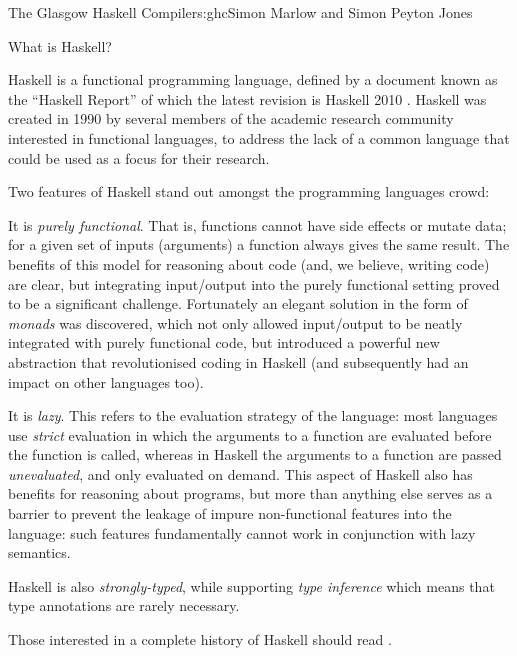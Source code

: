 \begin{aosachapter}{The Glasgow Haskell Compiler}{s:ghc}{Simon Marlow and Simon Peyton Jones}
\begin{aosasect1}{What is Haskell?}

Haskell is a functional programming language, defined by a document
known as the ``Haskell Report'' of which the latest revision is
Haskell 2010 \cite{bib:haskell2010}.  Haskell was created in 1990 by
several members of the academic research community interested in
functional languages, to address the lack of a common language that
could be used as a focus for their research.

Two features of Haskell stand out amongst the programming languages
crowd:

\begin{aosaitemize}

\item It is \emph{purely functional}.  That is, functions cannot have
  side effects or mutate data; for a given set of inputs (arguments) a
  function always gives the same result.  The benefits of this model
  for reasoning about code (and, we believe, writing code) are clear,
  but integrating input/output into the purely functional setting
  proved to be a significant challenge.  Fortunately an elegant
  solution in the form of \emph{monads} was discovered, which not only
  allowed input/output to be neatly integrated with purely functional
  code, but introduced a powerful new abstraction that revolutionised
  coding in Haskell (and subsequently had an impact on other languages
  too).

\item It is \emph{lazy}.  This refers to the evaluation strategy of
  the language: most languages use \emph{strict} evaluation in which
  the arguments to a function are evaluated before the function is
  called, whereas in Haskell the arguments to a function are passed
  \emph{unevaluated}, and only evaluated on demand.  This aspect of
  Haskell also has benefits for reasoning about programs, but more
  than anything else serves as a barrier to prevent the leakage of
  impure non-functional features into the language: such features
  fundamentally cannot work in conjunction with lazy semantics.

\end{aosaitemize}

Haskell is also \emph{strongly-typed}, while supporting \emph{type
  inference} which means that type annotations are rarely necessary.

Those interested in a complete history of Haskell should read
\cite{bib:haskellhistory}.


\end{aosasect1}
\end{aosachapter}
